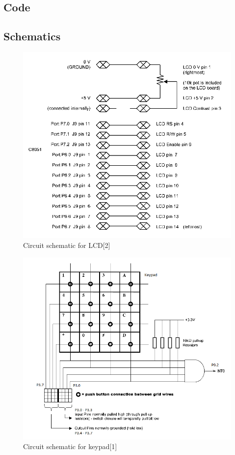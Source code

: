 \documentclass[12pt]{article}
\begin{document}
\subsection{Code}
	
\subsection{Schematics}
\begin{figure}[H]
	\centering
	\includegraphics[width=\textwidth]{lcd_schematic.png}
	\caption[]{Circuit schematic for LCD[2]}
	\label{LCD}
\end{figure}
\begin{figure}[H]
	\centering
	\includegraphics[width=\textwidth]{keypad_schematic.png}
	\caption[]{Circuit schematic for keypad[1]}
	\label{KEY}
\end{figure}
\end{document}
